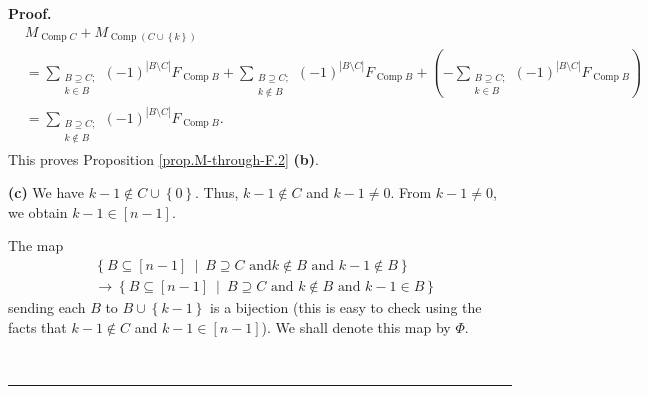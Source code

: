 \documentclass[numbers=enddot,12pt,final,onecolumn,notitlepage]{scrartcl}%
\theoremstyle{definition}
\newenvironment{proof}[1][Proof]{\noindent\textbf{#1.} }{\ \rule{0.5em}{0.5em}}
\newenvironment{verlong}{}{}
\let\sumnonlimits\sum
\renewcommand{\sum}{\sumnonlimits\limits}
\begin{document}
\begin{verlong}
\begin{proof}
\begin{align*}
&  M_{\operatorname*{Comp}C}+M_{\operatorname*{Comp}\left(  C\cup\left\{
k\right\}  \right)  }\\
&  =\sum_{\substack{B\supseteq C;\\k\in B}}\left(  -1\right)  ^{\left\vert
B\setminus C\right\vert }F_{\operatorname*{Comp}B}+\sum_{\substack{B\supseteq
C;\\k\notin B}}\left(  -1\right)  ^{\left\vert B\setminus C\right\vert
}F_{\operatorname*{Comp}B}+\left(  -\sum_{\substack{B\supseteq C;\\k\in
B}}\left(  -1\right)  ^{\left\vert B\setminus C\right\vert }%
F_{\operatorname*{Comp}B}\right) \\
&  =\sum_{\substack{B\supseteq C;\\k\notin B}}\left(  -1\right)  ^{\left\vert
B\setminus C\right\vert }F_{\operatorname*{Comp}B}.
\end{align*}
This proves Proposition \ref{prop.M-through-F.2} \textbf{(b)}.

\textbf{(c)} We have $k-1\notin C\cup\left\{  0\right\}  $. Thus, $k-1\notin
C$ and $k-1\neq0$. From $k-1\neq0$, we obtain $k-1\in\left[  n-1\right]  $.

The map%
\begin{align}
&  \left\{  B\subseteq\left[  n-1\right]  \ \mid\ B\supseteq C\text{ and
}k\notin B\text{ and }k-1\notin B\right\} \nonumber\\
&  \rightarrow\left\{  B\subseteq\left[  n-1\right]  \ \mid\ B\supseteq
C\text{ and }k\notin B\text{ and }k-1\in B\right\} \nonumber
\end{align}
sending each $B$ to $B\cup\left\{  k-1\right\}  $ is a bijection (this is easy
to check using the facts that $k-1\notin C$ and $k-1\in\left[  n-1\right]  $).
We shall denote this map by $\Phi$.


\end{proof}
\end{verlong}
\end{document}
